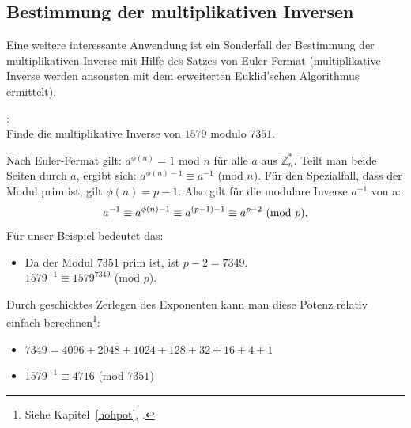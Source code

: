 \begin{refsegment}
\subsection{Bestimmung der multiplikativen Inversen}

Eine weitere interessante Anwendung ist ein Sonderfall der Bestimmung der
multiplikativen Inverse mit Hilfe des Satzes von Euler-Fermat
(multiplikative Inverse werden ansonsten mit dem  erweiterten Euklid'schen
Algorithmus ermittelt).

\begin{example}{:}\\
Finde die multiplikative Inverse von $1579$ modulo $7351$.

Nach Euler-Fermat gilt: $a^{\phi(n)}= 1$ mod $n$ für alle $a$ aus $\mathbb{Z}_n^*$.
Teilt man beide Seiten durch $a$, ergibt sich: $a^{\phi(n) - 1} \equiv a^{-1}$ (mod $n$).
Für den Spezialfall, dass der Modul prim ist, gilt $\phi(n) = p - 1$.
Also gilt für die modulare Inverse $ a^{-1}$ von a:
$$a^{-1} \equiv a^{\phi(n) - 1} \equiv a^{(p-1)-1} \equiv a^{p-2} {\rm ~(mod~} p). $$
Für unser Beispiel bedeutet das:
\begin{itemize}
   \item[]  Da der Modul $7351$ prim ist, ist $p-2 = 7349$.\\
        $1579^{-1} \equiv 1579^{7349}$ (mod $p$).
\end{itemize}
Durch geschicktes Zerlegen des Exponenten kann man diese Potenz relativ einfach
berechnen\footnote{%
Siehe Kapitel~\ref{hohpot}, \glqq {}\grqq.
}:
\begin{itemize}
   \item[] $7349 = 4096 + 2048 + 1024 + 128 + 32 + 16 + 4 + 1$
   \item[] $1579^{-1} \equiv 4716$ (mod $7351$)
\end{itemize}
\end{example}


\end{refsegment}
